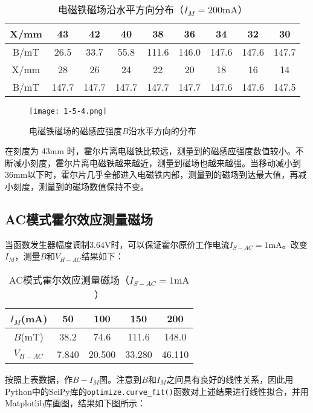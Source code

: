 \documentclass[12pt]{article}
\begin{document}
\begin{table}
    \centering
    \caption{电磁铁磁场沿水平方向分布（$I_M=200\mathrm{mA}$）}
    \begin{tabular}{|c|c|c|c|c|c|c|c|c|}
        \hline
        X/mm & 43 & 42 & 40 & 38 & 36 & 34 & 32 & 30 \\
        \hline
        B/mT & 26.5 & 33.7 & 55.8 & 111.6 & 146.0 & 147.6 & 147.6 & 147.7 \\
        \hline
        X/mm & 28 & 26 & 24 & 22 & 20 & 18 & 16 & 14 \\
        \hline
        B/mT & 147.7 & 147.7 & 147.7 & 147.7 & 147.7 & 147.6 & 147.6 & 147.5 \\
        \hline
    \end{tabular}
\end{table}

\begin{figure}[htbp]
    \centering
    \texttt{[image: 1-5-4.png]}
    \caption{电磁铁磁场的磁感应强度$B$沿水平方向的分布}
\end{figure}

在刻度为 43mm 时，霍尔片离电磁铁比较远，测量到的磁感应强度数值较小。不断减小刻度，霍尔片离电磁铁越来越近，测量到磁场也越来越强。当移动减小到36mm以下时，霍尔片几乎全部进入电磁铁内部，测量到的磁场到达最大值，再减小刻度，测量到的磁场数值保持不变。

\subsection{AC模式霍尔效应测量磁场}
当函数发生器幅度调制$3.64\mathrm{V}$时，可以保证霍尔原价工作电流$I_{S-AC}=1\mathrm{mA}$。改变$I_M$，测量$B$和$V_{H-AC}$结果如下：

\begin{table}[htbp]
    \centering
    \caption{AC模式霍尔效应测量磁场（$I_{S-AC}=1\mathrm{mA}$）}
    \begin{tabular}{|c|c|c|c|c|}
        \hline
        $I_M$(mA) & 50 & 100 & 150 & 200 \\
        \hline
        $B$(mT) & 38.2 & 74.6 & 111.6 & 148.0 \\
        \hline
        $V_{H-AC}$ & 7.840 & 20.500 & 33.280 & 46.110 \\
        \hline
    \end{tabular}
\end{table}

按照上表数据，作$B-I_M$图。注意到$B$和$I_M$之间具有良好的线性关系，因此用Python中的SciPy库的\verb|optimize.curve_fit()|函数对上述结果进行线性拟合，并用Matplotlib库画图，结果如下图所示：
\end{document}
